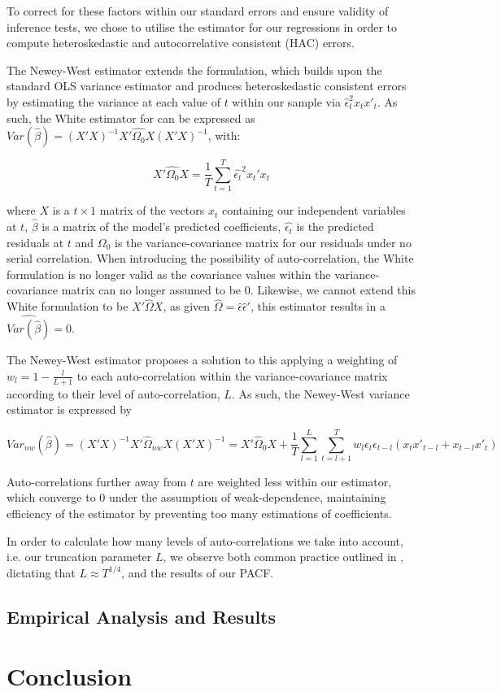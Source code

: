 \documentclass[12pt]{article}
\begin{document}
To correct for these factors within our standard errors and ensure validity of inference tests, we chose to utilise the \citet{newey} estimator for our regressions in order to compute heteroskedastic and autocorrelative consistent (HAC) errors.

The Newey-West estimator extends the \citet{white} formulation, which builds upon the standard OLS variance estimator and produces heteroskedastic consistent errors by estimating the variance at each value of $t$ within our sample via $\hat{\epsilon}^2_tx_tx'_t$. As such, the White estimator for can be expressed as $Var(\hat{\beta})=(X'X)^{-1}X'\hat{\Omega_0}X(X'X)^{-1}$, with:

$$
X'\hat{\Omega_0}X=\frac{1}{T}\sum_{t=1}^T\hat{\epsilon_t}^2x_t'x_t
$$

where $X$ is a $t\times1$ matrix of the vectors $x_t$ containing our independent variables at $t$, $\hat{\beta}$ is a matrix of the model’s predicted coefficients, $\hat{\epsilon_t}$ is the predicted residuals at $t$ and $\Omega_0$ is the variance-covariance matrix for our residuals under no serial correlation. When introducing the possibility of auto-correlation, the White formulation is no longer valid as the covariance values within the variance-covariance matrix can no longer assumed to be 0. Likewise, we cannot extend this White formulation to be $X'\hat{\Omega}X$, as given $\hat{\Omega}=\hat{\epsilon}\hat{\epsilon}'$, this estimator results in a $\hat{Var(\hat{\beta})}=0$.

The Newey-West estimator proposes a solution to this applying a weighting of $w_l=1-\frac{l}{L+1}$ to each auto-correlation within the variance-covariance matrix according to their level of auto-correlation, $L$. As such, the Newey-West variance estimator is expressed by

$$
Var_{nw}(\hat{\beta})=(X'X)^{-1}X'\hat{\Omega}_{nw}X(X'X)^{-1}=X'\hat{\Omega}_0X+\frac{1}{T}\sum^L_{l=1}\sum^T_{t=l+1}w_l\epsilon_t\epsilon_{t-l}(x_tx'_{t-l}+x_{t-l}x'_t)
$$

Auto-correlations further away from $t$ are weighted less within our estimator, which converge to 0 under the assumption of weak-dependence, maintaining efficiency of the estimator by preventing too many estimations of coefficients.

In order to calculate how many levels of auto-correlations we take into account, i.e. our truncation parameter $L$, we observe both common practice outlined in \cite{greene}, dictating that $L\approx{T^{1/4}}$, and the results of our PACF.

\subsection{Empirical Analysis and Results}



\break

\section{Conclusion}

\break



\end{document}
